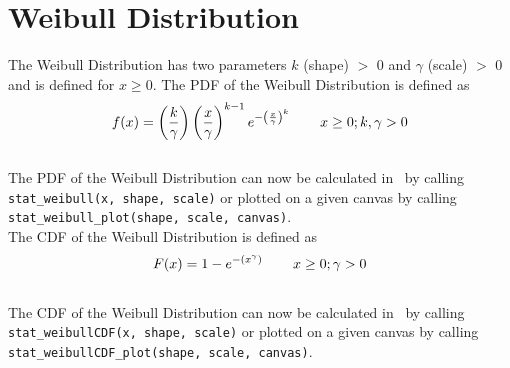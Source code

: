 	\section{Weibull Distribution}
	
		The Weibull Distribution has two parameters $k$ (shape) $>$ 0 and $\gamma$ (scale) $>$ 0 and is defined for $x \geq 0$. The \ac{PDF} of the Weibull Distribution is defined as
		\\[0.3cm]
		$$f(x) = \left(\frac{k}{\gamma}\right)\left(\frac{x}{\gamma}\right)^{k-1}e^{-\left(\frac{x}{\gamma}\right)^{k}} \hspace{.3in} x \geq 0; k,\gamma > 0\\$$
		\\[0.3cm]
		The \ac{PDF} of the Weibull Distribution can now be calculated in \setlx\ by calling \lstinline{stat_weibull(x, shape, scale)} or plotted on a given canvas by calling \lstinline{stat_weibull_plot(shape, scale, canvas)}.
		\\[0.3cm]
		The \ac{CDF} of the Weibull Distribution is defined as
		\\[0.3cm]
		$$F(x) = 1 - e^{-(x^{\gamma})} \hspace{.3in} x \geq 0; \gamma > 0$$
		\\[0.3cm]
		The \ac{CDF} of the Weibull Distribution can now be calculated in \setlx\ by calling \lstinline{stat_weibullCDF(x, shape, scale)} or plotted on a given canvas by calling \lstinline{stat_weibullCDF_plot(shape, scale, canvas)}.
		